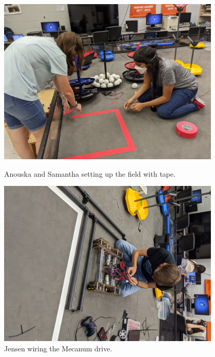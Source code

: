 \begin{figure}[ht]
\centering
\begin{minipage}[b]{.48\textwidth}
  \centering
  \includegraphics[width=0.95\textwidth]{Meetings/September/09-30-21/9-30-21_Hardware_Image1 - Nathan Forrer.jpg}
  \caption{Anouska and Samantha setting up the field with tape.}
  \label{fig:pic1}
\end{minipage}%
\hfill%
\begin{minipage}[b]{.48\textwidth}
  \centering
  \includegraphics[width=0.95\textwidth]{Meetings/September/09-30-21/9-30-21_Hardware_Image2 - Nathan Forrer.jpg}
  \caption{Jensen wiring the Mecanum drive.}
  \label{fig:pic2}
\end{minipage}
\end{figure}


